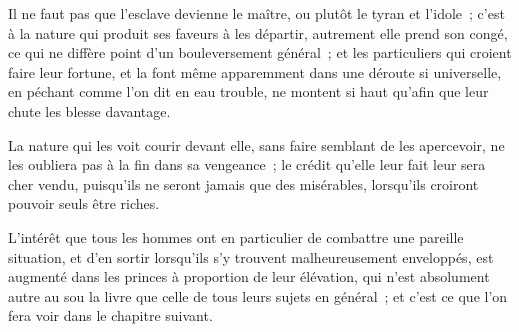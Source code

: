 \documentclass[french,twoside]{book} %
\begin{document}
Il ne faut pas que l’esclave devienne le maître, ou plutôt le tyran et l’idole ; c’est à la nature qui produit ses faveurs à les départir, autrement elle prend son congé, ce qui ne diffère point d’un bouleversement général ; et les particuliers qui croient faire leur fortune, et la font même apparemment dans une déroute si universelle, en péchant comme l’on dit en eau trouble, ne montent si haut qu’afin que leur chute les blesse davantage.\par
La nature qui les voit courir devant elle, sans faire semblant de les apercevoir, ne les oubliera pas à la fin dans sa vengeance ; le crédit qu’elle leur fait leur sera cher vendu, puisqu’ils ne seront jamais que des misérables, lorsqu’ils croiront pouvoir seuls être riches.\par
L’intérêt que tous les hommes ont en particulier de combattre une pareille situation, et d’en sortir lorsqu’ils s’y trouvent malheureusement enveloppés, est augmenté dans les princes à proportion de leur élévation, qui n’est absolument autre au sou la livre que celle de tous leurs sujets en général ; et c’est ce que l’on fera voir dans le chapitre suivant.
\end{document}
